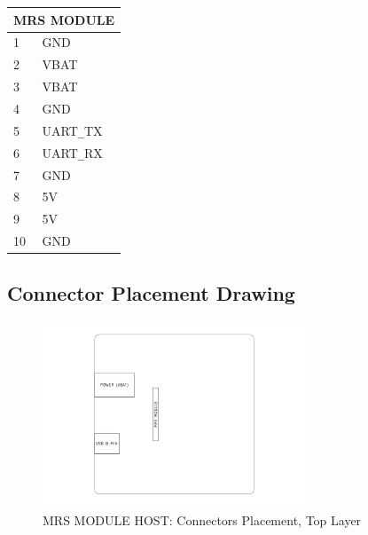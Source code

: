 \documentclass[12pt, a4paper]{article}
\begin{document}
\begin{center}
\begin{tabular}{|l|l|}
\hline
\multicolumn{2}{|p{3cm}|}{\centering\textbf{MRS MODULE}} \\ \hline
1               & GND         			\\ \hline
2               & VBAT        			\\ \hline
3               & VBAT        			\\ \hline
4               & GND         			\\ \hline
5               & UART\verb|_|TX    	\\ \hline
6               & UART\verb|_|RX     	\\ \hline
7               & GND         			\\ \hline
8               & 5V          			\\ \hline
9               & 5V          			\\ \hline
10              & GND         			\\ \hline
\end{tabular}
\end{center}

\subsection{Connector Placement Drawing}
\begin{figure}[h]
\centering
\includegraphics[width=0.7\textwidth]{figures/Connectors_top.pdf}
\caption{MRS MODULE HOST: Connectors Placement, Top Layer}
\label{fig:connectors_top}
\end{figure}

\pagebreak
{}
\end{document}
